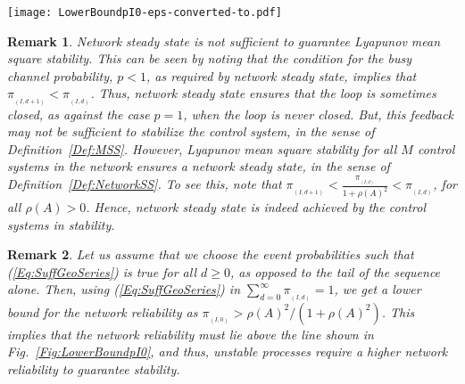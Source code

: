 \documentclass[twocolumn]{autart}
\newtheorem{remark}{Remark}[section]
\begin{document}
\begin{figure*}[tb]
\centering
\texttt{[image: LowerBoundpI0-eps-converted-to.pdf]}
\caption{A sufficient condition for Lyapunov mean square stability that requires the network reliability, $\pi_{_{(I,0)}}$, to be greater than the line demarcating the regions, with respect to the spectral radius $\rho(A)$. Thus, unstable processes require a higher network reliability to guarantee stability. }
\label{Fig:LowerBoundpI0}
\end{figure*}

\begin{remark}\textbf{}
Network steady state is not sufficient to guarantee Lyapunov mean square stability. This can be seen by noting that the condition for the busy channel probability, $p < 1$, as required by network steady state, implies that $\pi_{_{(I,d+1)}} < \pi_{_{(I,d)}}$. Thus, network steady state ensures that the loop is sometimes closed, as against the case $p=1$, when the loop is never closed. But, this feedback may not be sufficient to stabilize the control system, in the sense of Definition~\ref{Def:MSS}. However, Lyapunov mean square stability for all $M$ control systems in the network ensures a network steady state, in the sense of Definition~\ref{Def:NetworkSS}. To see this, note that $\pi_{_{(I,d+1)}} < \frac{\pi_{_{(I,d)}}}{1+\rho(A)^2} < \pi_{_{(I,d)}}$, for all $\rho(A)>0$. Hence, network steady state is indeed achieved by the control systems in stability.
\end{remark}

\begin{remark} \textbf{} \label{Remark:pI0}
Let us assume that we choose the event probabilities such that (\ref{Eq:SuffGeoSeries}) is true for all $d \ge 0$, as opposed to the tail of the sequence alone. Then, using (\ref{Eq:SuffGeoSeries}) in $\sum_{d=0}^{\infty} \pi_{_{(I,d)}} = 1$, we get a lower bound for the network reliability as $\pi_{_{(I,0)}} > \rho(A)^2/(1+\rho(A)^2)$. This implies that the network reliability must lie above the line shown in Fig.~\ref{Fig:LowerBoundpI0}, and thus, unstable processes require a higher network reliability to guarantee stability.
\end{remark}
\end{document}
